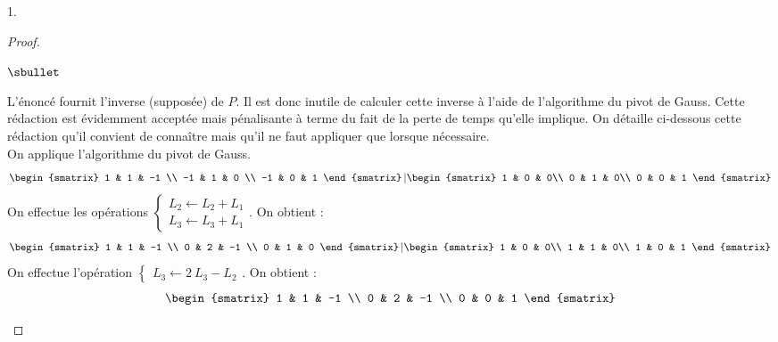 \documentclass[11pt]{article}%
\begin{document}
\begin{noliste}{1.}
\begin{proof}
\begin{noliste}{$\sbullet$}
    \noindent
    ~\\[-1.5cm]
    \begin{remarkL}{.97}%
      L'énoncé fournit l'inverse (supposée) de $P$. Il est donc
      inutile de calculer cette inverse à l'aide de l'algorithme du
      pivot de Gauss. Cette rédaction est évidemment acceptée mais
      pénalisante à terme du fait de la perte de temps qu'elle
      implique. On détaille ci-dessous cette rédaction qu'il convient
      de connaître mais qu'il ne faut appliquer que lorsque
      nécessaire.\\[.2cm]
      On applique l'algorithme du pivot de Gauss.\\[-.1cm]
      \[
      \begin{smatrix}
        1 & 1 & -1 \\
        -1 & 1 & 0 \\
        -1 & 0 & 1
      \end{smatrix}
      \left\vert
        \begin{smatrix}
          1 & 0 & 0\\
          0 & 1 & 0\\
          0 & 0 & 1
        \end{smatrix}
      \right.
      \]
      On effectue les opérations $\left\{
        \begin{array}{l}
          L_2 \leftarrow L_2 + L_1\\
          L_3 \leftarrow L_3 + L_1
        \end{array}
      \right.$. On obtient :
      \[
      \begin{smatrix}
        1 & 1 & -1 \\
        0 & 2 & -1 \\
        0 & 1 & 0
      \end{smatrix}
      \left\vert
        \begin{smatrix}
          1 & 0 & 0\\
          1 & 1 & 0\\
          1 & 0 & 1
        \end{smatrix}
      \right.
      \]
      On effectue l'opération $\left\{
        \begin{array}{l}
          L_3 \leftarrow 2 \ L_3 - L_2
        \end{array}
      \right.$. On obtient :
      \[
      \begin{smatrix}
        1 & 1 & -1 \\
        0 & 2 & -1 \\
        0 & 0 & 1

\end{smatrix}\]
\end{remarkL}
\end{noliste}
\end{proof}
\end{noliste}
\end{document}
